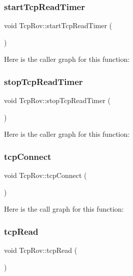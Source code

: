 \subsubsection{\texorpdfstring{start\+Tcp\+Read\+Timer}{startTcpReadTimer}}
{\footnotesize\ttfamily void Tcp\+Rov\+::start\+Tcp\+Read\+Timer (\begin{DoxyParamCaption}{ }\end{DoxyParamCaption})\hspace{0.3cm}{\ttfamily [slot]}}

Here is the caller graph for this function\+:
\mbox{\label{class_tcp_rov_a0663b83a515ba834e58913407aeb2246}} 
\subsubsection{\texorpdfstring{stop\+Tcp\+Read\+Timer}{stopTcpReadTimer}}
{\footnotesize\ttfamily void Tcp\+Rov\+::stop\+Tcp\+Read\+Timer (\begin{DoxyParamCaption}{ }\end{DoxyParamCaption})\hspace{0.3cm}{\ttfamily [slot]}}

Here is the caller graph for this function\+:
\mbox{\label{class_tcp_rov_a0eee6d4cc81a4a1ffefc7d5860a2161e}} 
\subsubsection{\texorpdfstring{tcp\+Connect}{tcpConnect}}
{\footnotesize\ttfamily void Tcp\+Rov\+::tcp\+Connect (\begin{DoxyParamCaption}{ }\end{DoxyParamCaption})\hspace{0.3cm}{\ttfamily [slot]}}

Here is the call graph for this function\+:
\mbox{\label{class_tcp_rov_a6d49254af0b9a4a53675dbae32c5a937}} 
\subsubsection{\texorpdfstring{tcp\+Read}{tcpRead}}
{\footnotesize\ttfamily void Tcp\+Rov\+::tcp\+Read (\begin{DoxyParamCaption}{ }\end{DoxyParamCaption})\hspace{0.3cm}{\ttfamily [slot]}}

